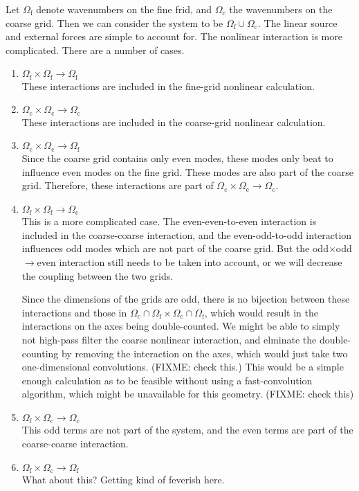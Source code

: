 \documentclass[10pt,showpacs,showkeys,%
amsfonts,amsmath,onecolumn,
floatfix,aps,superscriptaddress]{revtex4}
\begin{document}
Let $\Omega_{\text{f}}$ denote wavenumbers on the fine frid, and
$\Omega_{\text{c}}$ the wavenumbers on the coarse grid. Then we can
consider the system to be $\Omega_{\text{f}} \cup \Omega_{\text{c}}$.
The linear source and external forces are simple to account for.
The nonlinear interaction is more complicated.  There are a number
of cases.
\begin{enumerate}
  \item 
    $\Omega_{\text{f}} \times \Omega_{\text{f}}\rightarrow \Omega_{\text{f}}$\\
    These interactions are included in the fine-grid nonlinear calculation.
  \item 
    $\Omega_{\text{c}} \times \Omega_{\text{c}}\rightarrow \Omega_{\text{c}}$\\
    These interactions are included in the coarse-grid nonlinear calculation.
  \item 
    $\Omega_{\text{c}} \times \Omega_{\text{c}}\rightarrow \Omega_{\text{f}}$\\
    Since the coarse grid contains only even modes, these modes only beat
    to influence even modes on the fine grid.  These modes are also part
    of the coarse grid.  Therefore, these interactions are part of
    $\Omega_{\text{c}} \times \Omega_{\text{c}}\rightarrow \Omega_{\text{c}}$.
  \item
    $\Omega_{\text{f}} \times \Omega_{\text{f}}\rightarrow \Omega_{\text{c}}$\\
    This is a more complicated case. The even-even-to-even interaction
    is included in the coarse-coarse interaction, and the even-odd-to-odd
    interaction influences odd modes which are not part of the coarse grid.
    But the odd$\times$odd$\rightarrow$even interaction still needs to
    be taken into account, or we will decrease the coupling between the
    two grids.
    
    Since the dimensions of the grids are odd, there is no bijection
    between these interactions and those in 
    $\Omega_{\text{c}}\cap \Omega_{\text{f}} \times 
    \Omega_{\text{c}}\cap \Omega_{\text{f}}$, which would result in the 
    interactions on the axes being double-counted. We might be able to
    simply not high-pass filter the coarse nonlinear interaction, and 
    elminate the double-counting by removing the interaction on the 
    axes, which would just take two one-dimensional convolutions. 
    (FIXME: check this.) This would be a simple enough calculation
    as to be feasible without using a fast-convolution algorithm, which
    might be unavailable for this geometry. (FIXME: check this)
    
  \item
    $\Omega_{\text{f}} \times \Omega_{\text{c}}\rightarrow \Omega_{\text{c}}$\\
    This odd terms are not part of the system, and the even terms are
    part of the coarse-coarse interaction.
  \item
    $\Omega_{\text{f}} \times \Omega_{\text{c}}\rightarrow \Omega_{\text{f}}$\\
    What about this?  Getting kind of feverish here.
\end{enumerate}
\end{document}
